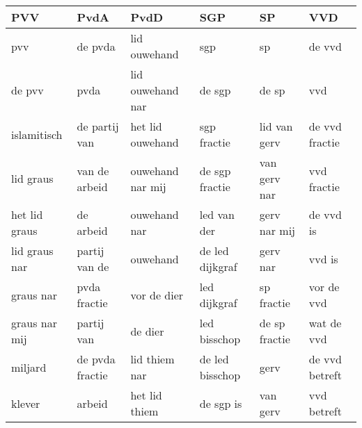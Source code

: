 \begin{tabular}{llllll}
\toprule
           PVV &             PvdA &              PvdD &              SGP &             SP &             VVD \\
\midrule
           pvv &          de pvda &      lid ouwehand &              sgp &             sp &          de vvd \\
        de pvv &             pvda &  lid ouwehand nar &           de sgp &          de sp &             vvd \\
   islamitisch &    de partij van &  het lid ouwehand &      sgp fractie &   lid van gerv &  de vvd fractie \\
     lid graus &    van de arbeid &  ouwehand nar mij &   de sgp fractie &   van gerv nar &     vvd fractie \\
 het lid graus &        de arbeid &      ouwehand nar &      led van der &   gerv nar mij &       de vvd is \\
 lid graus nar &    partij van de &          ouwehand &  de led dijkgraf &       gerv nar &          vvd is \\
     graus nar &     pvda fractie &       vor de dier &     led dijkgraf &     sp fractie &      vor de vvd \\
 graus nar mij &       partij van &           de dier &     led bisschop &  de sp fractie &      wat de vvd \\
       miljard &  de pvda fractie &     lid thiem nar &  de led bisschop &           gerv &  de vvd betreft \\
        klever &           arbeid &     het lid thiem &        de sgp is &       van gerv &     vvd betreft \\
\bottomrule
\end{tabular}
